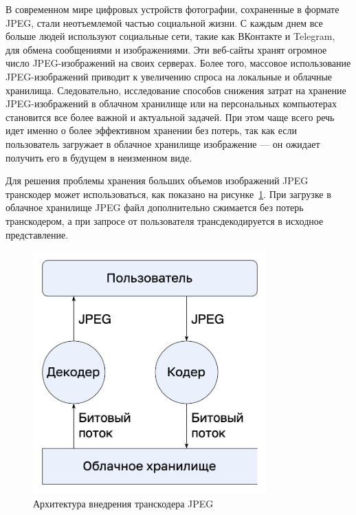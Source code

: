 \documentclass[times,specification,annotation]{itmo-student-thesis}
\begin{document}
В современном мире цифровых устройств фотографии, сохраненные в формате JPEG, стали неотъемлемой частью социальной жизни. С каждым днем все больше людей используют социальные сети, такие как ВКонтакте и Telegram, для обмена сообщениями и изображениями. Эти веб-сайты хранят огромное число JPEG-изображений на своих серверах. Более того, массовое использование JPEG-изображений приводит к увеличению спроса на локальные и облачные хранилища. Следовательно, исследование способов снижения затрат на хранение JPEG-изображений в облачном хранилище или на персональных компьютерах становится все более важной и актуальной задачей. При этом чаще всего речь идет именно о более эффективном хранении без потерь, так как если пользователь загружает в облачное хранилище изображение — он ожидает получить его в будущем в неизменном виде. \par

Для решения проблемы хранения больших объемов изображений JPEG транскодер может использоваться, как показано на рисунке~\ref{cloud-storage-system}. При загрузке в облачное хранилище JPEG файл дополнительно сжимается без потерь транскодером, а при запросе от пользователя трансдекодируется в исходное представление.\par

\begin{figure}[!h]
    \centering
    \includegraphics[width=9cm]{./images/cloud-storage-system.png}
    \caption{Архитектура внедрения транскодера JPEG}
    \label{cloud-storage-system}
\end{figure}
\end{document}
